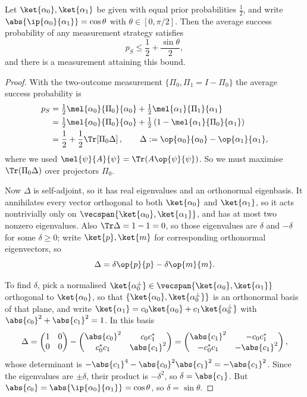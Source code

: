 \begin{theorem}
	Let $\ket{\alpha_0},\ket{\alpha_1}$ be given with equal prior probabilities $\tfrac12$, and write $\abs{\ip{\alpha_0}{\alpha_1}} = \cos\theta$ with $\theta \in [0,\pi/2]$. Then the average success probability of any measurement strategy satisfies
	$$p_S \leq \frac{1}{2} + \frac{\sin\theta}{2},$$
	and there is a measurement attaining this bound.
\end{theorem}

\begin{proof}
	With the two-outcome measurement $\{\Pi_0,\Pi_1 = I - \Pi_0\}$ the average success probability is
	\begin{align*}
		p_S &= \tfrac12\mel{\alpha_0}{\Pi_0}{\alpha_0} + \tfrac12\mel{\alpha_1}{\Pi_1}{\alpha_1}\\
		&= \tfrac12\mel{\alpha_0}{\Pi_0}{\alpha_0} + \tfrac12\left(1 - \mel{\alpha_1}{\Pi_0}{\alpha_1}\right) \\
		&= \frac12 + \frac12\Tr\!\left[\Pi_0 \Delta\right], \qquad \Delta := \op{\alpha_0}{\alpha_0} - \op{\alpha_1}{\alpha_1},
	\end{align*}
	where we used $\mel{\psi}{A}{\psi} = \Tr(A\op{\psi}{\psi})$. So we must maximise $\Tr(\Pi_0\Delta)$ over projectors $\Pi_0$.

	Now $\Delta$ is self-adjoint, so it has real eigenvalues and an orthonormal eigenbasis. It annihilates every vector orthogonal to both $\ket{\alpha_0}$ and $\ket{\alpha_1}$, so it acts nontrivially only on $\vecspan\{\ket{\alpha_0},\ket{\alpha_1}\}$, and has at most two nonzero eigenvalues. Also $\Tr\Delta = 1 - 1 = 0$, so those eigenvalues are $\delta$ and $-\delta$ for some $\delta \geq 0$; write $\ket{p}, \ket{m}$ for corresponding orthonormal eigenvectors, so
	$$\Delta = \delta\op{p}{p} - \delta\op{m}{m}.$$

	To find $\delta$, pick a normalised $\ket{\alpha_0^\perp} \in \vecspan\{\ket{\alpha_0},\ket{\alpha_1}\}$ orthogonal to $\ket{\alpha_0}$, so that $\{\ket{\alpha_0}, \ket{\alpha_0^\perp}\}$ is an orthonormal basis of that plane, and write $\ket{\alpha_1} = c_0\ket{\alpha_0} + c_1\ket{\alpha_0^\perp}$ with $\abs{c_0}^2 + \abs{c_1}^2 = 1$. In this basis
	$$\Delta = \begin{pmatrix} 1 & 0 \\ 0 & 0\end{pmatrix} - \begin{pmatrix} \abs{c_0}^2 & c_0c_1^* \\ c_0^*c_1 & \abs{c_1}^2 \end{pmatrix} = \begin{pmatrix} \abs{c_1}^2 & -c_0c_1^* \\ -c_0^*c_1 & -\abs{c_1}^2\end{pmatrix},$$
	whose determinant is $-\abs{c_1}^4 - \abs{c_0}^2\abs{c_1}^2 = -\abs{c_1}^2$. Since the eigenvalues are $\pm\delta$, their product is $-\delta^2$, so $\delta = \abs{c_1}$. But $\abs{c_0} = \abs{\ip{\alpha_0}{\alpha_1}} = \cos\theta$, so $\delta = \sin\theta$.


\end{proof}
